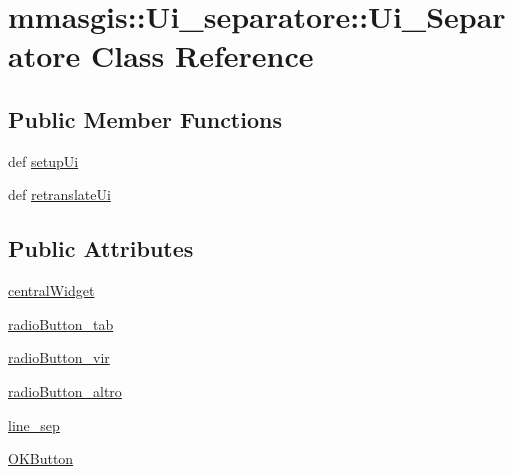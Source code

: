\hypertarget{classmmasgis_1_1Ui__separatore_1_1Ui__Separatore}{
\section{mmasgis::Ui\_\-separatore::Ui\_\-Separatore Class Reference}
\label{classmmasgis_1_1Ui__separatore_1_1Ui__Separatore}
}
\subsection*{Public Member Functions}
\begin{DoxyCompactItemize}
\item 
def \hyperlink{classmmasgis_1_1Ui__separatore_1_1Ui__Separatore_ac6a55c91fd489701df1f3dd9220c61d3}{setupUi}
\item 
def \hyperlink{classmmasgis_1_1Ui__separatore_1_1Ui__Separatore_a60c85e1f78a7ff56c7f2e94e6edabba5}{retranslateUi}
\end{DoxyCompactItemize}
\subsection*{Public Attributes}
\begin{DoxyCompactItemize}
\item 
\hyperlink{classmmasgis_1_1Ui__separatore_1_1Ui__Separatore_a45412f989fb06a7fe829ae06e93c1066}{centralWidget}
\item 
\hyperlink{classmmasgis_1_1Ui__separatore_1_1Ui__Separatore_a260ff74cdd6f68cbc2bc66a4603f3ee2}{radioButton\_\-tab}
\item 
\hyperlink{classmmasgis_1_1Ui__separatore_1_1Ui__Separatore_ac84dcc30fb2bddeeba02665ab2a410fd}{radioButton\_\-vir}
\item 
\hyperlink{classmmasgis_1_1Ui__separatore_1_1Ui__Separatore_a5c13fa008b3140dcf7ccd6b50a7af9e2}{radioButton\_\-altro}
\item 
\hyperlink{classmmasgis_1_1Ui__separatore_1_1Ui__Separatore_a4656096088c45f3b20a9a45c544aa339}{line\_\-sep}
\item 
\hyperlink{classmmasgis_1_1Ui__separatore_1_1Ui__Separatore_a6a8e868e4d44b661e3e0cad183c04e53}{OKButton}
\end{DoxyCompactItemize}


